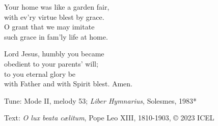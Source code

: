 \hymn



\begin{underhymnverse}
Your home was like a garden fair,\\
with ev’ry virtue blest by grace.\\
O grant that we may imitate\\
such grace in fam’ly life at home.

Lord Jesus, humbly you became\\
obedient to your parents’ will;\\
to you eternal glory be\\
with Father and with Spirit blest. Amen.
\end{underhymnverse}

\begin{hymnsource}
Tune: Mode II, melody 53; \emph{Liber Hymnarius}, Solesmes, 1983*

Text: \emph{O lux beata cælitum}, Pope Leo XIII, 1810-1903, © 2023 ICEL
\end{hymnsource}
